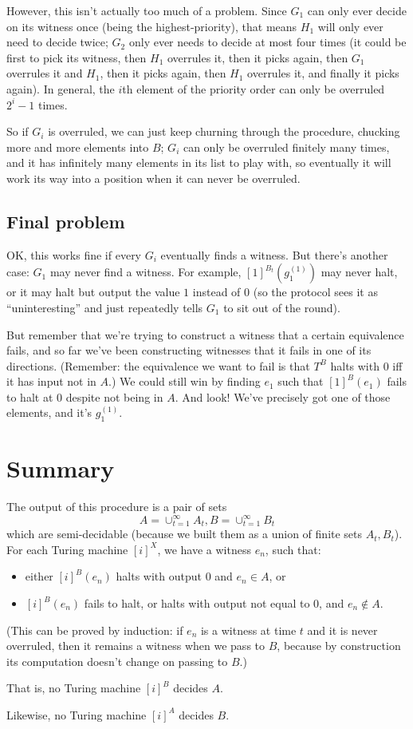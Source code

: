 \documentclass[11pt]{amsart}
\begin{document}
However, this isn't actually too much of a problem.
Since $G_1$ can only ever decide on its witness once (being the highest-priority), that means $H_1$ will only ever need to decide twice; $G_2$ only ever needs to decide at most four times (it could be first to pick its witness, then $H_1$ overrules it, then it picks again, then $G_1$ overrules it and $H_1$, then it picks again, then $H_1$ overrules it, and finally it picks again).
In general, the $i$th element of the priority order can only be overruled $2^i - 1$ times.

So if $G_i$ is overruled, we can just keep churning through the procedure, chucking more and more elements into $B$; $G_i$ can only be overruled finitely many times, and it has infinitely many elements in its list to play with, so eventually it will work its way into a position when it can never be overruled.

\subsection{Final problem}
OK, this works fine if every $G_i$ eventually finds a witness.
But there's another case: $G_1$ may never find a witness.
For example, $[1]^{B_t}(g^{(1)}_1)$ may never halt, or it may halt but output the value $1$ instead of $0$ (so the protocol sees it as ``uninteresting'' and just repeatedly tells $G_1$ to sit out of the round).

But remember that we're trying to construct a witness that a certain equivalence fails, and so far we've been constructing witnesses that it fails in one of its directions.
(Remember: the equivalence we want to fail is that $T^B$ halts with $0$ iff it has input not in $A$.)
We could still win by finding $e_1$ such that $[1]^B(e_1)$ fails to halt at $0$ despite not being in $A$.
And look! We've precisely got one of those elements, and it's $g^{(1)}_1$.

\section{Summary}

The output of this procedure is a pair of sets $$\displaystyle A = \cup_{t=1}^{\infty} A_t, B = \cup_{t=1}^{\infty} B_t$$
which are semi-decidable (because we built them as a union of finite sets $A_t, B_t$).
For each Turing machine $[i]^X$, we have a witness $e_n$, such that:
\begin{itemize}
\item either $[i]^B(e_n)$ halts with output $0$ and $e_n \in A$, or
\item $[i]^B(e_n)$ fails to halt, or halts with output not equal to $0$, and $e_n \not \in A$.
\end{itemize}
(This can be proved by induction: if $e_n$ is a witness at time $t$ and it is never overruled, then it remains a witness when we pass to $B$, because by construction its computation doesn't change on passing to $B$.)

That is, no Turing machine $[i]^B$ decides $A$.

Likewise, no Turing machine $[i]^A$ decides $B$.
\end{document}
